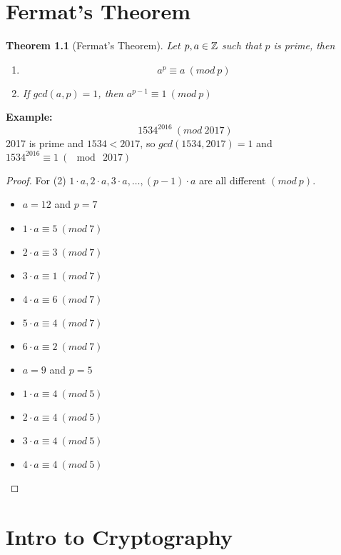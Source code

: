 \documentclass[openany]{report}
\newtheorem{theorem}{Theorem}[section]
\begin{document}
\chapter{Fermat's Theorem}
\begin{theorem}[Fermat's Theorem]
    Let $p,a \in \mathbb{Z}$ such that $p$ is prime, then 
    \begin{enumerate}
        \item
    $$a^p \equiv a \ (mod \ p)$$
        \item
    If $gcd(a,p) = 1$, then $a^{p-1} \equiv 1 \ (mod \ p)$
        
    \end{enumerate}
\end{theorem}
\textbf{Example:} 
$$1534^{2016} \ (mod \ 2017)$$
2017 is prime and $1534 < 2017$, so $gcd(1534, 2017) = 1$ and $1534^2016 \equiv 1 \ (\mod \ 2017)$
\begin{proof}For (2)
$1 \cdot a, 2\cdot a, 3 \cdot a, \dots, (p-1)\cdot a$ are all different $(mod \ p)$. 
\raggedcolumns
\begin{multicols}{2}
\begin{itemize}
    \item $a = 12$ and $p = 7$
    \item $1 \cdot a \equiv 5 \ (mod \ 7)$
    \item $2 \cdot a \equiv 3 \ (mod \ 7)$
    \item $3 \cdot a \equiv 1 \ (mod \ 7)$
    \item $4 \cdot a \equiv 6 \ (mod \ 7)$
    \item $5 \cdot a \equiv 4 \ (mod \ 7)$
    \item $6 \cdot a \equiv 2 \ (mod \ 7)$
\end{itemize}
\columnbreak
\begin{itemize}
    \item $a = 9$ and $p = 5$
    \item $1 \cdot a \equiv 4 \ (mod \ 5)$
    \item $2 \cdot a \equiv 4 \ (mod \ 5)$
    \item $3 \cdot a \equiv 4 \ (mod \ 5)$
    \item $4 \cdot a \equiv 4 \ (mod \ 5)$
\end{itemize}
\end{multicols}



\end{proof}
\chapter{Intro to Cryptography}
\end{document}
